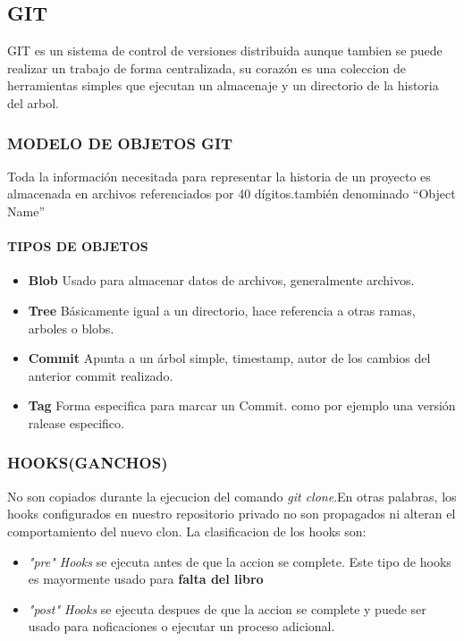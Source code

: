 \subsection{GIT}
GIT es un sistema de control de versiones distribuida aunque tambien se puede realizar un trabajo de forma centralizada, su corazón es una coleccion de herramientas simples que ejecutan un almacenaje y un directorio de la historia del arbol.
\subsubsection{MODELO DE OBJETOS GIT}
Toda la información necesitada para representar la historia de un proyecto es almacenada en archivos referenciados por 40 dígitos.también denominado ``Object Name''
\paragraph{TIPOS DE OBJETOS}
\begin{itemize}
 \item \textbf{Blob} Usado para almacenar datos de archivos, generalmente archivos.
 \item \textbf{Tree} Básicamente igual a un directorio, hace referencia a otras ramas, arboles o blobs.
 \item \textbf{Commit} Apunta a un árbol simple, timestamp, autor de los cambios del anterior commit realizado.
 \item \textbf{Tag} Forma especifica para marcar un Commit. como por ejemplo una versión ralease especifico.
\end{itemize}

\subsubsection{HOOKS(GANCHOS)}
No son copiados durante la ejecucion del comando \textit{git clone}.En otras palabras, los hooks configurados en nuestro repositorio privado no son propagados ni alteran el 
comportamiento del nuevo clon.
La clasificacion de los hooks son:
\begin{itemize}
 \item \textit{"pre" Hooks} se ejecuta antes de que la accion se complete. Este tipo de hooks es mayormente usado para \textbf{falta del libro}
 \item \textit{"post" Hooks} se ejecuta despues de que la accion se complete y puede ser usado para noficaciones o ejecutar un proceso adicional.
\end{itemize}

